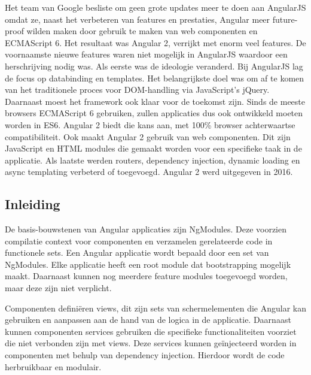 
Het team van Google besliste om geen grote updates meer te doen aan AngularJS omdat ze, naast het verbeteren van features en prestaties, Angular meer future-proof wilden maken door gebruik te maken van web componenten en ECMAScript 6. Het resultaat was Angular 2, verrijkt met enorm veel features. De voornaamste nieuwe features waren niet mogelijk in AngularJS waardoor een herschrijving nodig was. Als eerste was de ideologie veranderd. Bij AngularJS lag de focus op databinding en templates. Het belangrijkste doel was om af te komen van het traditionele proces voor DOM-handling via JavaScript's jQuery. Daarnaast moest het framework ook klaar voor de toekomst zijn. Sinds de meeste browsers ECMAScript 6 gebruiken, zullen applicaties dus ook ontwikkeld moeten worden in ES6. Angular 2 biedt die kans aan, met 100\% browser achterwaartse compatibiliteit. Ook maakt Angular 2 gebruik van web componenten. Dit zijn JavaScript en HTML modules die gemaakt worden voor een specifieke taak in de applicatie. Als laatste werden routers, dependency injection, dynamic loading en async templating verbeterd of toegevoegd. Angular 2 werd uitgegeven in 2016. \autocite{Shan2015}


\subsection{Inleiding}

De basis-bouwstenen van Angular applicaties zijn NgModules. Deze voorzien compilatie context voor componenten en verzamelen gerelateerde code in functionele sets. Een Angular applicatie wordt bepaald door een set van NgModules. Elke applicatie heeft een root module dat bootstrapping mogelijk maakt. Daarnaast kunnen nog meerdere feature modules toegevoegd worden, maar deze zijn niet verplicht. \autocite{Angular2019a}

Componenten definiëren views, dit zijn sets van schermelementen die Angular kan gebruiken en aanpassen aan de hand van de logica in de applicatie. Daarnaast kunnen componenten services gebruiken die specifieke functionaliteiten voorziet die niet verbonden zijn met views. Deze services kunnen geïnjecteerd worden in componenten met behulp van dependency injection. Hierdoor wordt de code herbruikbaar en modulair. \autocite{Angular2019a}

